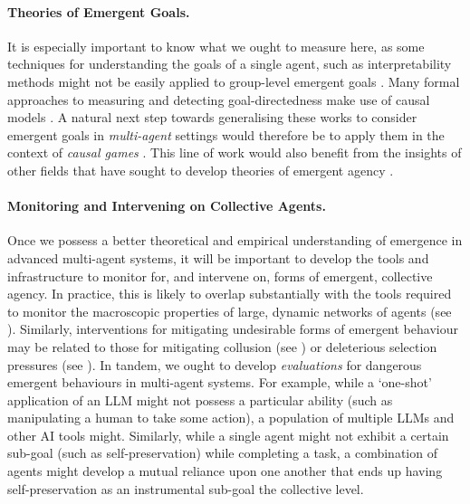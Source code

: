 \paragraph{Theories of Emergent Goals.}
It is especially important to know what we ought to measure here, as some techniques for understanding the goals of a single agent, such as interpretability methods \citep{Michaud2020,Colognese2023,Mini2023,Marks2023} might not be easily applied to group-level emergent goals \citep{Grupen2022}.
Many formal approaches to measuring and detecting goal-directedness make use of causal models \citep{Halpern2018,Everitt2021,Kenton2022,MacDermott2024,Ward2024}.
A natural next step towards generalising these works to consider emergent goals in \textit{multi-agent} settings would therefore be to apply them in the context of \emph{causal games} \citep{Hammond2023}.
This line of work would also benefit from the insights of other fields that have sought to develop theories of emergent agency \citep{friston2022designing,Okasha2018,Smith2020}.


\paragraph{Monitoring and Intervening on Collective Agents.}
Once we possess a better theoretical and empirical understanding of emergence in advanced multi-agent systems, it will be important to develop the tools and infrastructure to {monitor for, and intervene on, forms of emergent, collective agency}.
In practice, this is likely to overlap substantially with the tools required to monitor the macroscopic properties of large, dynamic networks of agents (see ).
Similarly, interventions for mitigating undesirable forms of emergent behaviour may be related to those for mitigating collusion (see ) or deleterious selection pressures (see ).
In tandem, we ought to develop \textit{evaluations} for dangerous emergent behaviours in multi-agent systems.
For example, while a `one-shot' application of an LLM might not possess a particular ability (such as manipulating a human to take some action), a population of multiple LLMs and other AI tools might.
Similarly, while a single agent might not exhibit a certain sub-goal (such as self-preservation) while completing a task, a combination of agents might develop a mutual reliance upon one another that ends up having self-preservation as an instrumental sub-goal the collective level.



